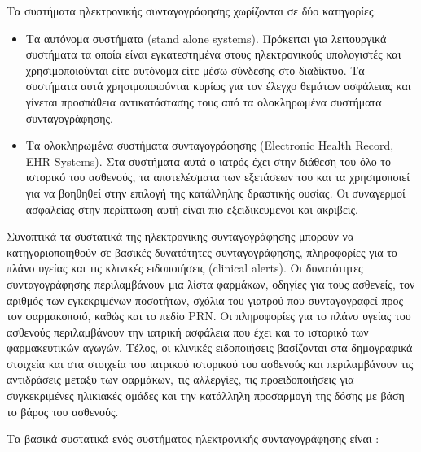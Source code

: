 		Τα συστήματα ηλεκτρονικής συνταγογράφησης χωρίζονται σε δύο κατηγορίες:
		
		\begin{itemize}
		
		\item Τα αυτόνομα συστήματα (stand alone systems). Πρόκειται για λειτουργικά συστήματα τα οποία είναι εγκατεστημένα στους ηλεκτρονικούς υπολογιστές  και χρησιμοποιούνται είτε αυτόνομα είτε μέσω σύνδεσης στο διαδίκτυο.  Τα συστήματα αυτά χρησιμοποιούνται κυρίως για τον έλεγχο θεμάτων ασφάλειας και γίνεται προσπάθεια αντικατάστασης τους από τα ολοκληρωμένα συστήματα συνταγογράφησης.

		\item Τα ολοκληρωμένα συστήματα συνταγογράφησης (Electronic Health Record, EHR Systems). Στα συστήματα αυτά ο ιατρός έχει στην διάθεση του όλο το ιστορικό του ασθενούς, τα αποτελέσματα των εξετάσεων του και τα χρησιμοποιεί για να βοηθηθεί στην επιλογή της κατάλληλης δραστικής ουσίας. Οι συναγερμοί ασφαλείας στην περίπτωση αυτή είναι πιο εξειδικευμένοι και ακριβείς.  

		\end{itemize}
		

		Συνοπτικά τα συστατικά της ηλεκτρονικής συνταγογράφησης μπορούν να κατηγοριοποιηθούν σε βασικές δυνατότητες συνταγογράφησης, πληροφορίες για το πλάνο υγείας και τις κλινικές ειδοποιήσεις (clinical alerts).  Οι δυνατότητες συνταγογράφησης περιλαμβάνουν μια λίστα φαρμάκων, οδηγίες για τους ασθενείς, τον αριθμός των εγκεκριμένων ποσοτήτων, σχόλια του γιατρού που συνταγογραφεί προς τον φαρμακοποιό, καθώς και το πεδίο PRN. Οι πληροφορίες για το πλάνο υγείας του ασθενούς περιλαμβάνουν την ιατρική ασφάλεια που έχει και το ιστορικό των φαρμακευτικών αγωγών. Τέλος, οι κλινικές ειδοποιήσεις  βασίζονται στα δημογραφικά στοιχεία και στα στοιχεία του ιατρικού ιστορικού του ασθενούς και περιλαμβάνουν τις αντιδράσεις μεταξύ των φαρμάκων, τις αλλεργίες, τις προειδοποιήσεις για συγκεκριμένες ηλικιακές ομάδες και την κατάλληλη προσαρμογή της δόσης με βάση το βάρος του ασθενούς. \cite{prescribing} 
		
		
		Τα βασικά συστατικά ενός συστήματος ηλεκτρονικής συνταγογράφησης είναι \cite{Grossman2012}:

